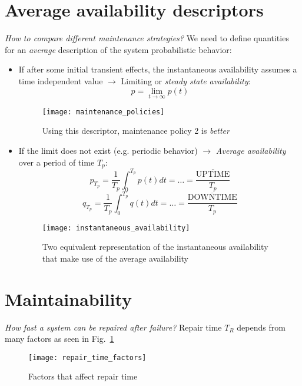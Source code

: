 \section{Average availability descriptors}
\emph{How to compare different maintenance strategies?} We need to define
quantities for an \emph{average} description of the system probabilistic
behavior:
\begin{itemize}
    \item If after some initial transient effects, the instantaneous
    availability assumes a time independent value $\to$ Limiting or \emph{steady
    state availability}:
    \begin{equation*}
        p = \lim_{t\to \infty} p(t)
    \end{equation*}
    \begin{figure}[H]
        \centering
        \texttt{[image: maintenance\_policies]}
        \caption{Using this descriptor, maintenance policy 2 is \emph{better}}
    \end{figure}
    \item If the limit does not exist (e.g. periodic behavior) $\to$
    \emph{Average availability} over a period of time $T_p$:
    \begin{equation*}
        p_{T_p} = \frac{1}{T_p} \int_0^{T_p} p(t)dt = \dots = \frac{\overline{\mathrm{UPTIME}}}{T_p}
    \end{equation*}
    \begin{equation*}
        q_{T_p} = \frac{1}{T_p} \int_0^{T_p} q(t)dt = \dots = \frac{\overline{\mathrm{DOWNTIME}}}{T_p}
    \end{equation*}
    \begin{figure}[H]
        \centering
        \texttt{[image: instantaneous\_availability]}
        \caption{Two equivalent representation of the instantaneous availability that make use of the average availability}
    \end{figure}
\end{itemize}

\section{Maintainability}
\emph{How fast a system can be repaired after failure?} Repair time $T_R$
depends from many factors as seen in Fig.~\ref{fig:repair_time_factors}
\begin{figure}[!htp]
    \centering
    \texttt{[image: repair\_time\_factors]}
    \caption{Factors that affect repair time}
    \label{fig:repair_time_factors}
\end{figure}

